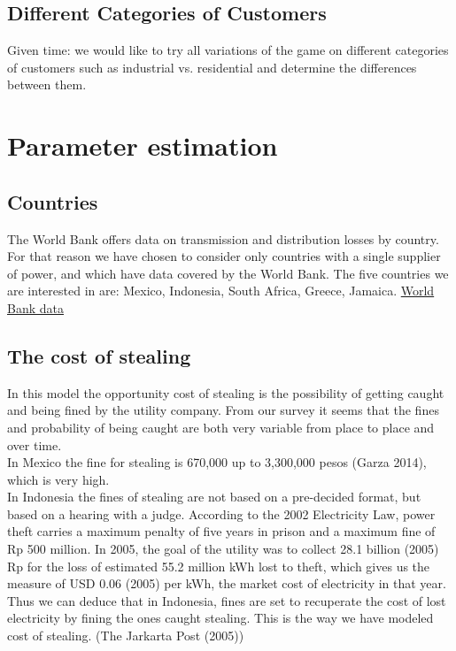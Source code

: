 \documentclass{article}
\begin{document}
\subsection{Different Categories of Customers}
Given time: we would like to try all variations of the game on different categories of customers such as industrial vs. residential and determine the differences between them.  

\section{Parameter estimation}

\subsection{Countries}
The World Bank offers data on transmission and distribution losses by country. For that reason we have chosen to consider only countries with a single supplier of power, and which have data covered by the World Bank.  The five countries we are interested in are: Mexico, Indonesia, South Africa, Greece, Jamaica. 
\href{http://data.worldbank.org/indicator/EG.ELC.LOSS.ZS}{World Bank data}

\subsection{The cost of stealing}
In this model the opportunity cost of stealing is the possibility of getting caught and being fined by the utility company. From our survey it seems that the fines and probability of being caught are both very variable from place to place and over time. \\

In Mexico the fine for stealing is 670,000 up to 3,300,000 pesos (Garza 2014), which is very high.\\

In Indonesia the fines of stealing are not based on a pre-decided format, but based on a hearing with a judge.  According to the 2002 Electricity Law, power theft carries a maximum penalty of five years in prison and a maximum fine of Rp 500 million. In 2005, the goal of the utility was to collect 28.1 billion (2005) Rp for the loss of estimated 55.2 million kWh lost to theft, which gives us the measure of USD 0.06 (2005) per kWh, the market cost of electricity in that year. Thus we can deduce that in Indonesia, fines are set to recuperate the cost of lost electricity by fining the ones caught stealing. This is the way we have modeled cost of stealing. (The Jarkarta Post (2005)) \\
\\
\end{document}
